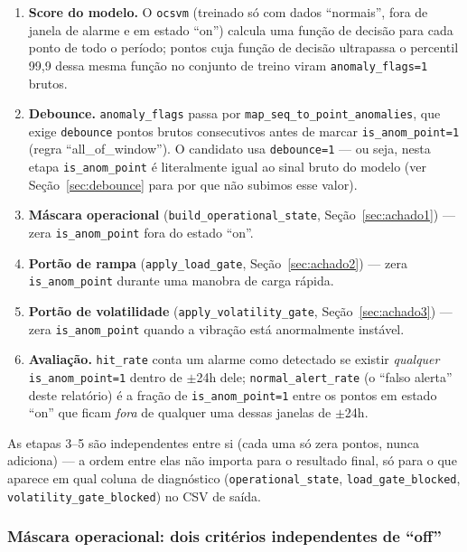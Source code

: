 \documentclass[11pt,a4paper]{article}
\begin{document}
\begin{enumerate}[label=\textbf{\arabic*.}]
  \item \textbf{Score do modelo.} O \texttt{ocsvm} (treinado só com dados
        ``normais'', fora de janela de alarme e em estado ``on'') calcula
        uma função de decisão para cada ponto de todo o período; pontos
        cuja função de decisão ultrapassa o percentil 99,9 dessa mesma
        função no conjunto de treino viram \texttt{anomaly\_flags=1}
        brutos.
  \item \textbf{Debounce.} \texttt{anomaly\_flags} passa por
        \texttt{map\_seq\_to\_point\_anomalies}, que exige
        \texttt{debounce} pontos brutos consecutivos antes de marcar
        \texttt{is\_anom\_point=1} (regra ``all\_of\_window''). O
        candidato usa \texttt{debounce=1} --- ou seja, nesta etapa
        \texttt{is\_anom\_point} é literalmente igual ao sinal bruto do
        modelo (ver Seção~\ref{sec:debounce} para por que não subimos
        esse valor).
  \item \textbf{Máscara operacional} (\texttt{build\_operational\_state},
        Seção~\ref{sec:achado1}) --- zera \texttt{is\_anom\_point} fora do
        estado ``on''.
  \item \textbf{Portão de rampa} (\texttt{apply\_load\_gate},
        Seção~\ref{sec:achado2}) --- zera \texttt{is\_anom\_point} durante
        uma manobra de carga rápida.
  \item \textbf{Portão de volatilidade} (\texttt{apply\_volatility\_gate},
        Seção~\ref{sec:achado3}) --- zera \texttt{is\_anom\_point} quando a
        vibração está anormalmente instável.
  \item \textbf{Avaliação.} \texttt{hit\_rate} conta um alarme como
        detectado se existir \emph{qualquer} \texttt{is\_anom\_point=1}
        dentro de $\pm$24h dele; \texttt{normal\_alert\_rate} (o ``falso
        alerta'' deste relatório) é a fração de \texttt{is\_anom\_point=1}
        entre os pontos em estado ``on'' que ficam \emph{fora} de
        qualquer uma dessas janelas de $\pm$24h.
\end{enumerate}

As etapas 3--5 são independentes entre si (cada uma só zera pontos, nunca
adiciona) --- a ordem entre elas não importa para o resultado final, só
para o que aparece em qual coluna de diagnóstico
(\texttt{operational\_state}, \texttt{load\_gate\_blocked},
\texttt{volatility\_gate\_blocked}) no CSV de saída.

\subsubsection*{Máscara operacional: dois critérios independentes de ``off''}
\end{document}
